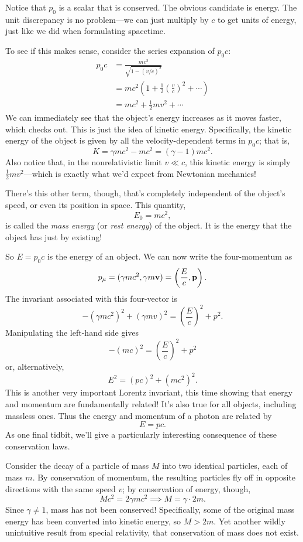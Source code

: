 \documentclass[../p023main.tex]{subfiles}
\begin{document}
Notice that $p_0$ is a scalar that is conserved.
The obvious candidate is energy.
The unit discrepancy is no problem---we can just multiply by $c$ to get units of energy, just like we did when formulating spacetime.

To see if this makes sense, consider the series expansion of $p_0c$:
\begin{align*}
    p_0c &= \frac{mc^2}{\sqrt{ 1 - \left( v / c \right)^2 }} \\
    &= mc^2 \left( 1 + \frac{1}{2} \left( \frac{v}{c} \right)^2 + \cdots \right) \\
    &= mc^2+ \frac{1}{2}mv^2 + \cdots
\end{align*}
We can immediately see that the object's energy increases as it moves faster, which checks out.
This is just the idea of kinetic energy.
Specifically, the kinetic energy of the object is given by all the velocity-dependent terms in $p_0c$; that is,
\[ K = \gamma mc^2 - mc^2 = (\gamma - 1)mc^2. \]
Also notice that, in the nonrelativistic limit $v \ll c$, this kinetic energy is simply $\frac{1}{2}mv^2$---which is exactly what we'd expect from Newtonian mechanics!

There's this other term, though, that's completely independent of the object's speed, or even its position in space.
This quantity,
\[ E_0 = mc^2, \]
is called the \textit{mass energy} (or \textit{rest energy}) of the object.
It is the energy that the object has just by existing!

So $E = p_0c$ is the energy of an object.
We can now write the four-momentum as
\[ p_\mu = (\gamma mc^2, \gamma m\mathbf{v}) = \left( \frac{E}{c}, \mathbf{p} \right). \]
The invariant associated with this four-vector is
\[ -(\gamma mc^2)^2 + (\gamma mv)^2 = \left( \frac{E}{c} \right)^2 + p^2. \]
Manipulating the left-hand side gives
\[ -(mc)^2 = \left( \frac{E}{c} \right)^2 + p^2 \]
or, alternatively,
\[ E^2 = (pc)^2 + (mc^2)^2. \]
This is another very important Lorentz invariant, this time showing that energy and momentum are fundamentally related!
It's also true for all objects, including massless ones.
Thus the energy and momentum of a photon are related by
\[ E = pc. \]
As one final tidbit, we'll give a particularly interesting consequence of these conservation laws.

Consider the decay of a particle of mass $M$ into two identical particles, each of mass $m$.
By conservation of momentum, the resulting particles fly off in opposite directions with the same speed $v$; by conservation of energy, though,
\[ Mc^2 = 2 \gamma mc^2 \implies M = \gamma \cdot 2m. \]
Since $\gamma \neq 1$, mass has not been conserved!
Specifically, some of the original mass energy has been converted into kinetic energy, so $M > 2m$.
Yet another wildly unintuitive result from special relativity, that conservation of mass does not exist.
\end{document}
